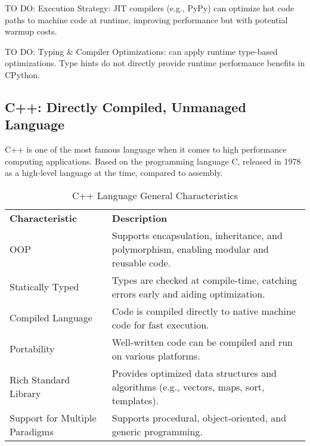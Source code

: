 TO DO: Execution Strategy: JIT compilers (e.g., PyPy) can optimize hot code paths to machine code at runtime, improving performance but with potential warmup costs.


TO DO: Typing \& Compiler Optimizations:  can apply runtime type-based optimizations. Type hints do not directly provide runtime performance benefits in CPython.


\subsection{C++: Directly Compiled, Unmanaged Language}
C++ is one of the most famous language when it comes to high performance computing applications. Based on the programming language C, released in 1978 as a high-level language at the time, compared to assembly.


\begin{table}[h]
	\centering
	\caption{C++ Language General Characteristics}
	\label{tab:cpp_characteristics}
	\begin{tabular}{>{\raggedright\arraybackslash}p{} >{\raggedright\arraybackslash}p{}}
		\toprule
		\multicolumn{2}{c}{\textbf{General Characteristics}} \\
		\midrule
		\textbf{Characteristic}           & \textbf{Description}\\
		\midrule
		\gls{OOP}                         & Supports encapsulation, inheritance, and \gls{polymorphism}, enabling modular and reusable code. \\
		\addlinespace
		Statically Typed                  & Types are checked at compile-time, catching errors early and aiding optimization.\\
		\addlinespace
		Compiled Language                 & Code is compiled directly to native machine code for fast execution.\\
		\addlinespace
		Portability                       & Well-written code can be compiled and run on various platforms.\\
		\addlinespace
		Rich Standard Library             & Provides optimized data structures and algorithms (e.g., vectors, maps, sort, templates).\\
		\addlinespace
		Support for Multiple Paradigms    & Supports procedural, object-oriented, and generic programming.\\
		\midrule
	\end{tabular}
\end{table}


